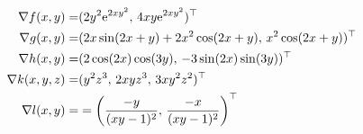 {
\begin{align*}
\nabla f(x,y)=& (2y^2\mathrm{e}^{2xy^2},\, 4xy\mathrm{e}^{2xy^2})^\top\\
\nabla g(x,y)=& (2x\sin(2x+y)+2x^2\cos(2x+y),\, x^2\cos(2x+y))^\top\\
\nabla h(x,y)=& (2\cos(2x)\cos(3y),\, -3\sin(2x)\sin(3y))^\top\\
\nabla k(x,y,z)=& (y^2z^3,\, 2xyz^3,\, 3xy^2z^2)^\top\\
\nabla l(x,y)=& =\left( \frac{-y}{(xy-1)^2},\, \frac{-x}{(xy-1)^2}\right)^\top
\end{align*}

}
